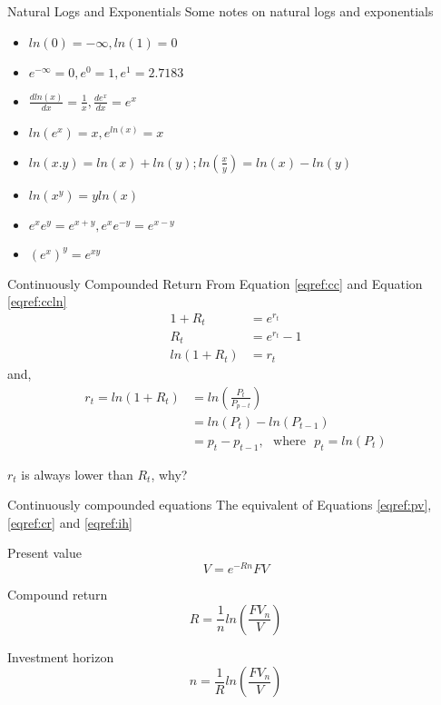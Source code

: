 \documentclass[14pt,xcolor=pdftex,dvipsnames,table]{beamer}
\begin{document}
\begin{frame}{Natural Logs and Exponentials}
Some notes on natural logs and exponentials
\begin{itemize}
\item $ln(0) = -\infty, ln(1) = 0$
\item $e^{-\infty} = 0, e^0 = 1, e^1 = 2.7183$
\item $\frac{dln(x)}{dx} = \frac{1}{x}, \frac{de^x}{dx}=e^x$
\item $ ln(e^x) = x, e^{ln(x)} = x$
\item $ln(x . y) = ln(x) + ln(y); ln \left ( \frac{x}{y} \right )= ln(x) - ln(y)$
\item $ln(x^y) = yln(x)$
\item $e^xe^y = e^{x+y}, e^xe^{-y} = e^{x-y}$
\item $(e^x)^y = e^{xy}$
\end{itemize}
\end{frame}

\begin{frame}{Continuously Compounded Return}
From Equation \ref{eqref:cc} and Equation \ref{eqref:ccln} 
\begin{align*}
1 + R_t &= e^{r_t}\\
R_t &= e^{r_t}-1\\
ln(1+R_t) &= r_t
\end{align*}
and, 
\begin{align*}
r_t = ln(1 + R_t) &= ln \left(\frac{P_t}{P_{p-t}}\right)\\
&= ln(P_t) - ln(P_{t-1})\\
& = p_t - p_{t-1}, \hspace{8pt} \text{where} \hspace{8pt} p_t = ln(P_t)  
\end{align*}

$r_t$ is always lower than $R_t$, why?
\end{frame}

\begin{frame}{Continuously compounded equations}
The equivalent of Equations \ref{eqref:pv}, \ref{eqref:cr} and \ref{eqref:ih}
\pause
\begin{block}{Present value}
\begin{equation}
V = e^{-Rn}FV
\end{equation}
\end{block}
\pause
\begin{block}{Compound return}
\begin{equation}
R = \frac{1}{n}ln \left (\frac{FV_n}{V} \right )
\end{equation}
\end{block}
\pause
\begin{block}{Investment horizon}
\begin{equation}
n = \frac{1}{R} ln \left ( \frac{FV_n}{V} \right )
\end{equation}
\end{block}
\end{frame}
\end{document}
